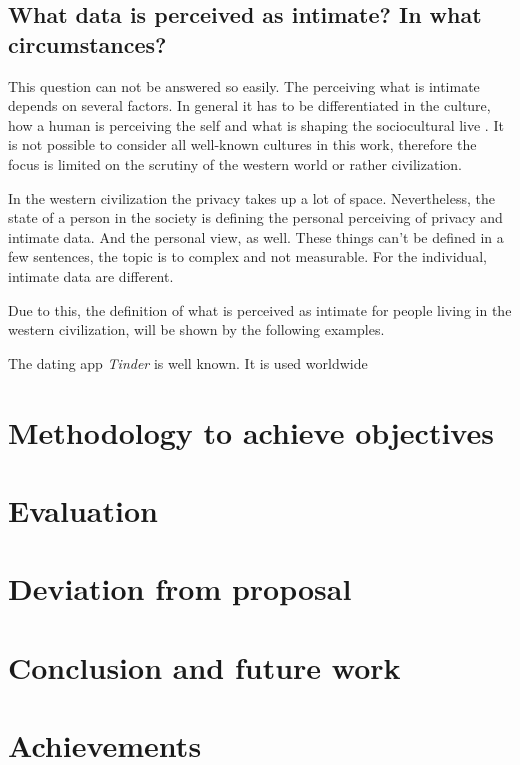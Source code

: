 \documentclass[journal]{vgtc}                %
\begin{document}
\subsection{What data is perceived as intimate? In what circumstances?}
This question can not be answered so easily. The perceiving what is intimate depends on several factors.
In general it has to be differentiated in the culture, how a human is perceiving the self and what is shaping the sociocultural live \cite{carrithers1985category}. It is not possible to consider all well-known cultures in this work, therefore the focus is limited on the scrutiny of the western world or rather civilization. 

In the western civilization the privacy takes up a lot of space. Nevertheless, the state of a person in the society is defining the personal perceiving of privacy and intimate data. And the personal view, as well.
These things can't be defined in a few sentences, the topic is to complex and not measurable. For the individual, intimate data are different.

Due to this, the definition of what is perceived as intimate for people living in the western civilization, will be shown by the following examples.

The dating app \textit{Tinder} is well known. It is used worldwide 

\section{Methodology to achieve objectives}
\section{Evaluation}
\section{Deviation from proposal}
\section{Conclusion and future work}
\section{Achievements}

\printbibliography
\end{document}

